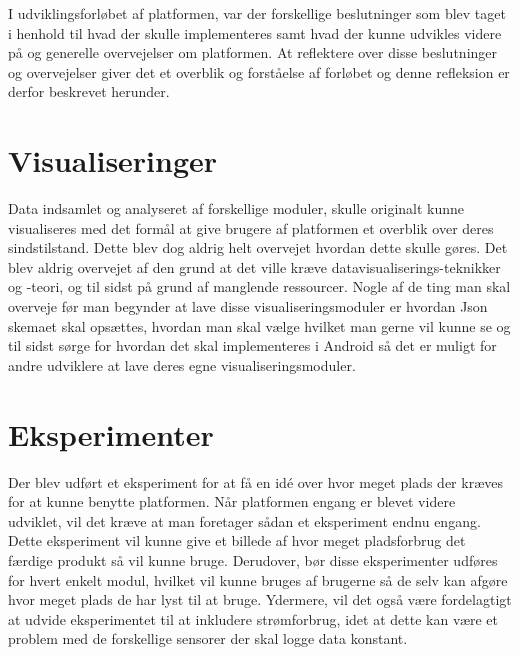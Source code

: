 I udviklingsforløbet af platformen, var der forskellige beslutninger som blev taget i henhold til hvad der skulle implementeres samt hvad der kunne udvikles videre på og generelle overvejelser om platformen.
At reflektere over disse beslutninger og overvejelser giver det et overblik og forståelse af forløbet og denne refleksion er derfor beskrevet herunder. 


\section{Visualiseringer}
Data indsamlet og analyseret af forskellige moduler, skulle originalt kunne visualiseres med det formål at give brugere af platformen et overblik over deres sindstilstand.
Dette blev dog aldrig helt overvejet hvordan dette skulle gøres. 
Det blev aldrig overvejet af den grund at det ville kræve datavisualiserings-teknikker og -teori, og til sidst på grund af manglende ressourcer. 
Nogle af de ting man skal overveje før man begynder at lave disse visualiseringsmoduler er hvordan Json skemaet skal opsættes, hvordan man skal vælge hvilket man gerne vil kunne se og til sidst sørge for hvordan det skal implementeres i Android så det er muligt for andre udviklere at lave deres egne visualiseringsmoduler.

\section{Eksperimenter}
Der blev udført et eksperiment for at få en idé over hvor meget plads der kræves for at kunne benytte platformen.
Når platformen engang er blevet videre udviklet, vil det kræve at man foretager sådan et eksperiment endnu engang. 
Dette eksperiment vil kunne give et billede af hvor meget pladsforbrug det færdige produkt så vil kunne bruge.
Derudover, bør disse eksperimenter udføres for hvert enkelt modul, hvilket vil kunne bruges af brugerne så de selv kan afgøre hvor meget plads de har lyst til at bruge.
Ydermere, vil det også være fordelagtigt at udvide eksperimentet til at inkludere strømforbrug, idet at dette kan være et problem med de forskellige sensorer der skal logge data konstant.

